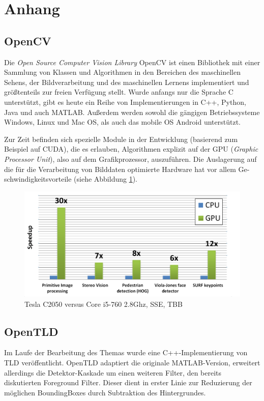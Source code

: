 \section{Anhang}
\subsection*{OpenCV}
Die \textit{Open Source Computer Vision Library} OpenCV ist einen Bibliothek mit einer Sammlung von Klassen und Algorithmen in den Bereichen des maschinellen Sehens, der Bildverarbeitung und des maschinellen Lernens implementiert und größtenteils zur freien Verfügung stellt. Wurde anfangs nur die Sprache C unterstützt, gibt es heute ein Reihe von Implementierungen in C++, Python, Java und auch MATLAB. Außerdem werden sowohl die gängigen Betriebssysteme Windows, Linux und Mac OS, als auch das mobile OS Android unterstützt.

Zur Zeit befinden sich spezielle Module in der Entwicklung (basierend zum Beispiel auf CUDA), die es erlauben, Algorithmen explizit auf der GPU (\textit{Graphic Processor Unit}), also auf dem Grafikprozessor, auszuführen. Die Auslagerung auf die für die Verarbeitung von Bilddaten optimierte Hardware hat vor allem Ge-schwindigkeitsvorteile (siehe Abbildung \ref{GPU_Performance}).

\begin{figure}
\centering{}\includegraphics[scale=0.5]{../pictures/GPU_Performance.png}\caption{Tesla C2050 versus Core i5-760 2.8Ghz, SSE, TBB \cite{OCW}}
\label{GPU_Performance}
\end{figure}

\subsection*{OpenTLD}
Im Laufe der Bearbeitung des Themas wurde eine C++-Implementierung von TLD veröffentlicht. OpenTLD adaptiert die originale MATLAB-Version, erweitert allerdings die Detektor-Kaskade um einen weiteren Filter, den bereits diskutierten Foreground Filter. Dieser dient in erster Linie zur Reduzierung der möglichen BoundingBoxes durch Subtraktion des Hintergrundes.

